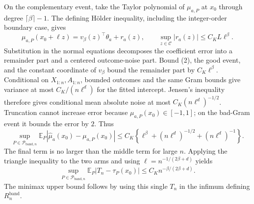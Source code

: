 On the complementary event, take the Taylor polynomial of
\(\mu_{a,P}\) at \(x_0\) through degree \(\lceil\beta\rceil-1\).  The defining
H\"older inequality, including the integer-order boundary case, gives
\[
\mu_{a,P}(x_0+\ell z)=v_\beta(z)^\top\theta_a+r_a(z),\qquad
\sup_{z\in\mathcal C}|r_a(z)|\leq C_KL\ell^\beta.
\]
Substitution in the normal equations decomposes the coefficient error into
a remainder part and a centered outcome-noise part.  Bound (2), the good
event, and the constant coordinate of \(v_\beta\) bound the remainder part
by \(C_K\ell^\beta\).  Conditional on \(X_{1:n},A_{1:n}\), bounded outcomes
and the same Gram bounds give variance at most \(C_K/(n\ell^d)\) for the
fitted intercept.  Jensen's inequality therefore gives conditional mean
absolute noise at most \(C_K(n\ell^d)^{-1/2}\).  Truncation cannot increase
error because \(\mu_{a,P}(x_0)\in[-1,1]\); on the bad-Gram event it bounds
the error by \(2\).  Thus
\[
\sup_{P\in\mathcal P_{\mathrm{band},n}}
\mathbb E_P|\widehat\mu_a(x_0)-\mu_{a,P}(x_0)|
\leq C_K\left\{\ell^\beta+(n\ell^d)^{-1/2}+(n\ell^d)^{-1}\right\}.
\]
The final term is no larger than the middle term for large \(n\).  Applying
the triangle inequality to the two arms and using
\(\ell=n^{-1/(2\beta+d)}\) yields
\[
\sup_{P\in\mathcal P_{\mathrm{band},n}}
\mathbb E_P|T_n-\tau_P(x_0)|\leq C_Kn^{-\beta/(2\beta+d)}.
\]
The minimax upper bound follows by using this single \(T_n\) in the
infimum defining \(R_n^{\mathrm{band}}\).